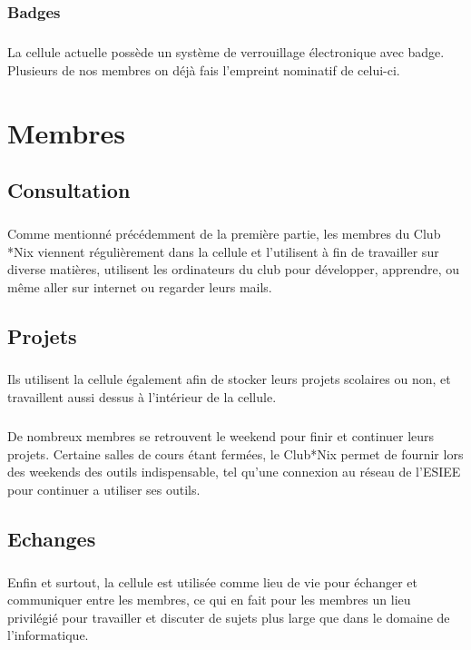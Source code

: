 \documentclass[11pt]{report}
\begin{document}
\subsection{Badges}
\paragraph{} La cellule actuelle possède un système de verrouillage
électronique avec badge. Plusieurs de nos membres on déjà fais l'empreint
nominatif de celui-ci.

\chapter{Membres}
\section{Consultation}
\paragraph{} Comme mentionné précédemment de la première partie, les membres du
Club *Nix viennent régulièrement dans la cellule et l'utilisent à fin de
travailler sur diverse matières, utilisent les ordinateurs du club pour
développer, apprendre, ou même aller sur internet ou regarder leurs mails.
\section{Projets}
\paragraph{} Ils utilisent la cellule également afin de stocker leurs projets
scolaires ou non, et travaillent aussi dessus à l'intérieur de la cellule.

\paragraph{} De nombreux membres se retrouvent le weekend pour finir et
continuer leurs projets. Certaine salles de cours étant fermées, le Club*Nix
permet de fournir lors des weekends des outils indispensable, tel qu'une
connexion au réseau de l'ESIEE pour continuer a utiliser ses outils.
\section{Echanges}
\paragraph{} Enfin et surtout, la cellule est utilisée comme lieu de vie pour
échanger et communiquer entre les membres, ce qui en fait pour les membres un
lieu privilégié pour travailler et discuter de sujets plus large que dans le
domaine de l'informatique.
\end{document}
